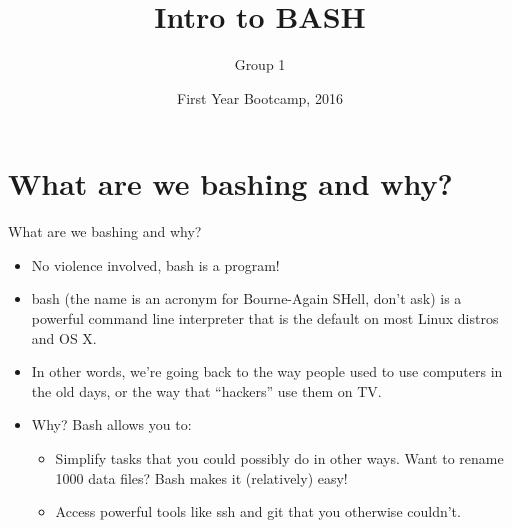 \documentclass{beamer}
\begin{document}
\title{Intro to BASH}
\subtitle{Group 1}
\author{}
\date{First Year Bootcamp, 2016}
\frame{\titlepage}


\section{What are we bashing and why?}
\begin{frame}{What are we bashing and why?}
\begin{itemize}
    \item<1-> No violence involved, bash is a program!
    \item<2-> bash (the name is an acronym for Bourne-Again SHell, don't ask) is a powerful command line interpreter that is the default on most Linux distros and OS X.
    \item<3-> In other words, we're going back to the way people used to use computers in the old days, or the way that ``hackers'' use them on TV.
    \item<4-> Why? Bash allows you to:
	\begin{itemize}
	    \item<4-> Simplify tasks that you could possibly do in other ways. Want to rename 1000 data files? Bash makes it (relatively) easy! 
	    \item<5-> Access powerful tools like ssh and git that you otherwise couldn't. 
	\end{itemize}
\end{itemize}
\begin{center}
\end{center}
\end{frame}
\end{document}
